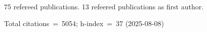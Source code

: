 75 refereed publications. 13 refeered publications as first author.

Total citations~=~5054; h-index~=~37 (2025-08-08)